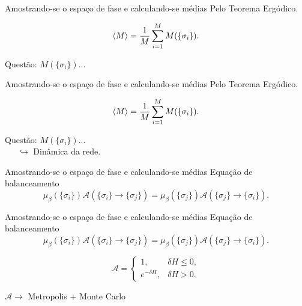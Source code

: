 \documentclass[10pt]{beamer}
\begin{document}
\begin{frame}{Amostrando-se o espaço de fase e calculando-se médias}
	Pelo Teorema Ergódico. 
	
	\begin{equation*}
		\ev{ M } = \frac{1}{M} \sum_{i = 1}^M M(\{ \sigma_i \}).
	\end{equation*}

	Questão: $M(\{ \sigma_i \})$...

\end{frame}


\begin{frame}{Amostrando-se o espaço de fase e calculando-se médias}
	Pelo Teorema Ergódico. 
	
	\begin{equation*}
		\ev{ M } = \frac{1}{M} \sum_{i = 1}^M M(\{ \sigma_i \}).
	\end{equation*}

	Questão: $M(\{ \sigma_i \})$... \\
	\ \ \ $ \hookrightarrow $ Dinâmica da rede.
\end{frame}


\begin{frame}{Amostrando-se o espaço de fase e calculando-se médias}
	Equação de balanceamento
	\begin{equation*}
		\mu_\beta (\{ \sigma_i \} ) \mathcal{A} (\{ \sigma_i \} \to \{ \sigma_j \}) = \mu_\beta(\{ \sigma_j \}) \mathcal{A}(\{ \sigma_j \} \to \{ \sigma_i \}). 
	\end{equation*}


\end{frame}


\begin{frame}{Amostrando-se o espaço de fase e calculando-se médias}
	Equação de balanceamento
	\begin{equation*}
		\mu_\beta (\{ \sigma_i \} ) \mathcal{A} (\{ \sigma_i \} \to \{ \sigma_j \}) = \mu_\beta(\{ \sigma_j \}) \mathcal{A}(\{ \sigma_j \} \to \{ \sigma_i \}). 
	\end{equation*}

	\begin{equation*}
		\mathcal{A} = 
		\begin{cases}
			1,   & \delta H \leq 0, \\
			e^{-\delta H},   &\delta H > 0.
		\end{cases}
	\end{equation*}

	$\mathcal{A} \to $ Metropolis + Monte Carlo
\end{frame}
\end{document}
